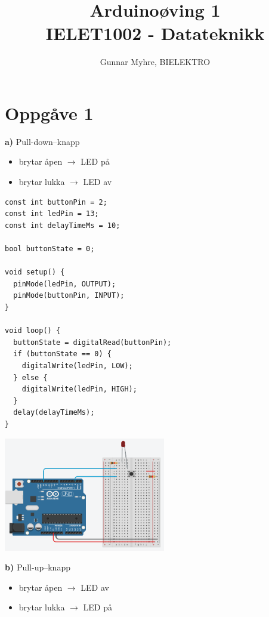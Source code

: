 \documentclass[12pt,a4paper]{article}
\title{%
  Arduinoøving 1 \\
  \large IELET1002 - Datateknikk \\
  }
\author{Gunnar Myhre, BIELEKTRO}
\begin{document}
  \maketitle
  \section{Oppgåve 1}
  \textbf{a)}
  Pull-down--knapp
  \begin{itemize}
    \item brytar åpen $\rightarrow$ LED på
    \item brytar lukka $\rightarrow$ LED av
  \end{itemize}


  \begin{lstlisting}[language=Arduino, basicstyle=\tiny]
const int buttonPin = 2;
const int ledPin = 13;
const int delayTimeMs = 10;

bool buttonState = 0;

void setup() {
  pinMode(ledPin, OUTPUT);
  pinMode(buttonPin, INPUT);
}

void loop() {
  buttonState = digitalRead(buttonPin);
  if (buttonState == 0) {
    digitalWrite(ledPin, LOW);
  } else {
    digitalWrite(ledPin, HIGH);
  }
  delay(delayTimeMs);
}
  \end{lstlisting}
  \begin{center}
    \includegraphics[width=200pt]{01_1_a.png}
  \end{center}

  \newpage
  \textbf{b)}
  Pull-up--knapp
  \begin{itemize}
    \item brytar åpen $\rightarrow$ LED av
    \item brytar lukka $\rightarrow$ LED på
  \end{itemize}
\end{document}
